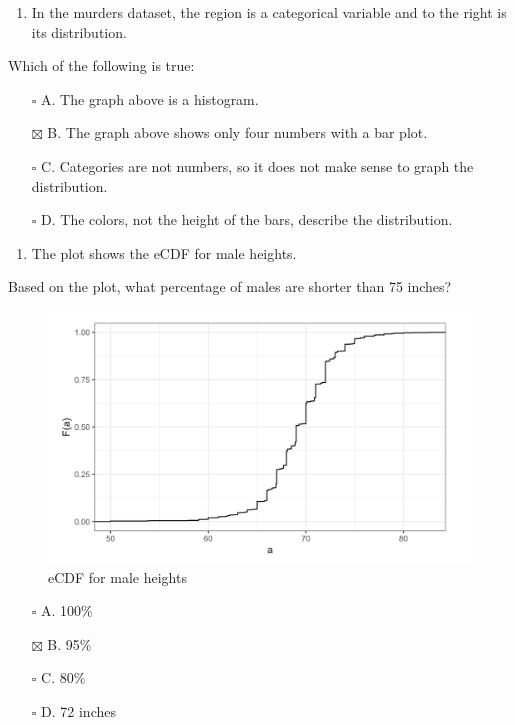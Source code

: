 \documentclass[
]{article}
\providecommand{\tightlist}{%
  \setlength{\itemsep}{0pt}\setlength{\parskip}{0pt}}
\begin{document}
\begin{enumerate}
\def\labelenumi{\arabic{enumi}.}
\setcounter{enumi}{1}
\tightlist
\item
  In the murders dataset, the region is a categorical variable and to
  the right is its distribution.
\end{enumerate}

Which of the following is true:

\begin{itemize}
\tightlist
\item[$\square$]
  A. The graph above is a histogram.
\item[$\boxtimes$]
  B. The graph above shows only four numbers with a bar plot.
\item[$\square$]
  C. Categories are not numbers, so it does not make sense to graph the
  distribution.
\item[$\square$]
  D. The colors, not the height of the bars, describe the distribution.
\end{itemize}

\begin{enumerate}
\def\labelenumi{\arabic{enumi}.}
\setcounter{enumi}{2}
\tightlist
\item
  The plot shows the eCDF for male heights.
\end{enumerate}

Based on the plot, what percentage of males are shorter than 75 inches?

\begin{figure}
\centering
\includegraphics{images/eCDF for male heights.png}
\caption{eCDF for male heights}
\end{figure}

\begin{itemize}
\tightlist
\item[$\square$]
  A. 100\%
\item[$\boxtimes$]
  B. 95\%
\item[$\square$]
  C. 80\%
\item[$\square$]
  D. 72 inches
\end{itemize}
\end{document}
